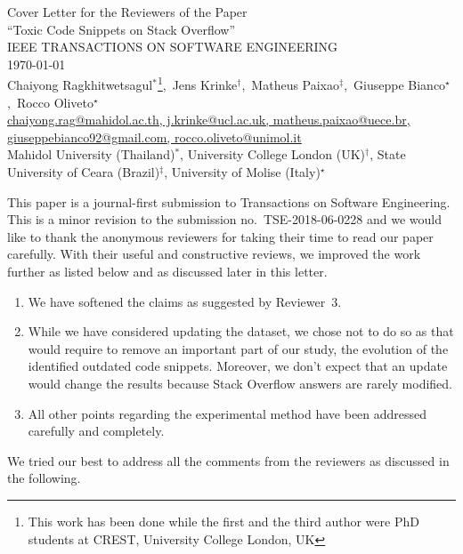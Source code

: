 \documentclass[a4paper,twoside,10pt]{reviewresponse}
\makeatletter
\newcommand{\myAuthors}{Chaiyong Ragkhitwetsagul$^\ast$\footnote{This work has been done while the first and the third author were PhD students at CREST, University College London, UK},~Jens Krinke$^\dagger$,~Matheus Paixao$^\ddagger$,~Giuseppe Bianco$^\star$,~Rocco Oliveto$^\star$}
\newcommand{\myEmail}{chaiyong.rag@mahidol.ac.th, j.krinke@ucl.ac.uk, matheus.paixao@uece.br, giuseppebianco92@gmail.com, rocco.oliveto@unimol.it}
\newcommand{\myTitle}{Cover Letter for the Reviewers of the Paper \\ ``Toxic Code Snippets on Stack Overflow''}
\newcommand{\myJournal}{IEEE TRANSACTIONS ON SOFTWARE ENGINEERING}
\newcommand{\myDept}{Mahidol University (Thailand)$^\ast$, University College London (UK)$^\dagger$, 
	State University of Ceara (Brazil)$^\ddagger$,
	University of Molise (Italy)$^\star$}
\makeatother
\begin{document}
\thispagestyle{plain}

\begin{center}
 {\LARGE\myTitle} \vspace{0.3cm} \\
 {\large\myJournal} \vspace{0.3cm} \\
 \today \vspace{0.3cm} \\
 \myAuthors \\
 \url{\myEmail} \\
 \vspace{0.3cm} 
 \myDept \vspace{1cm}
\end{center}



This paper is a journal-first submission to Transactions on Software Engineering. This is a minor revision to the submission no.~TSE-2018-06-0228 and we would like to thank the anonymous reviewers for taking their time to read our paper carefully. With their useful and constructive reviews, we improved the work further as listed below and as discussed later in this letter.

\begin{enumerate}
\item We have softened the claims as suggested by Reviewer~3.
\item While we have considered updating the dataset, we chose not to do so as that would require to remove an important part of our study, the evolution of the identified outdated code snippets. Moreover, we don't expect that an update would change the results because Stack Overflow answers are rarely modified.
\item All other points regarding the experimental method have been addressed carefully and completely.
\end{enumerate}

We tried our best to address all the comments from the reviewers as discussed in the following.
        

\end{document}
